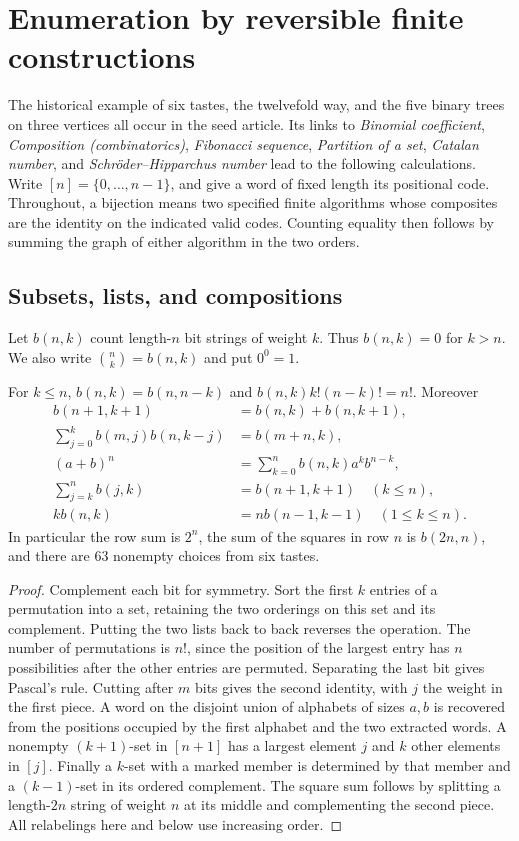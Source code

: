 \section{Enumeration by reversible finite constructions}
\label{sec:enumeration}
The historical example of six tastes, the twelvefold way, and the five
binary trees on three vertices all occur in the seed article. Its links to
\emph{Binomial coefficient}, \emph{Composition (combinatorics)},
\emph{Fibonacci sequence}, \emph{Partition of a set}, \emph{Catalan number},
and \emph{Schr\"oder--Hipparchus number} lead to the following calculations.
Write $[n]=\{0,\ldots,n-1\}$, and give a word of fixed length its positional
code. Throughout, a bijection means two specified finite algorithms whose
composites are the identity on the indicated valid codes. Counting equality
then follows by summing the graph of either algorithm in the two orders.

\subsection{Subsets, lists, and compositions}
Let $b(n,k)$ count length-$n$ bit strings of weight $k$. Thus $b(n,k)=0$
for $k>n$. We also write $\binom nk=b(n,k)$ and put $0^0=1$.
\begin{theorem}\label{result04}
For $k\le n$, $b(n,k)=b(n,n-k)$ and
$b(n,k)k!(n-k)!=n!$. Moreover
\begin{align*}
 b(n+1,k+1)&=b(n,k)+b(n,k+1),\\
 \sum_{j=0}^k b(m,j)b(n,k-j)&=b(m+n,k),\\
 (a+b)^n&=\sum_{k=0}^n b(n,k)a^k b^{n-k},\\
 \sum_{j=k}^n b(j,k)&=b(n+1,k+1) \quad(k\le n),\\
 k b(n,k)&=n b(n-1,k-1)\quad(1\le k\le n).
\end{align*}
In particular the row sum is $2^n$, the sum of the squares in row $n$ is
$b(2n,n)$, and there are $63$ nonempty choices from six tastes.
\end{theorem}
\begin{proof}
Complement each bit for symmetry. Sort the first $k$ entries of a
permutation into a set, retaining the two orderings on this set and its
complement. Putting the two lists back to back reverses the operation.
The number of permutations is $n!$, since the position of the largest
entry has $n$ possibilities after the other entries are permuted. Separating
the last bit gives Pascal's rule. Cutting after $m$ bits gives the second
identity, with $j$ the weight in the first piece. A word on the disjoint
union of alphabets of sizes $a,b$ is recovered from the positions occupied by
the first alphabet and the two extracted words. A nonempty $(k+1)$-set
in $[n+1]$ has a largest element $j$ and $k$ other elements in $[j]$.
Finally a $k$-set with a marked member is determined by that member and a
$(k-1)$-set in its ordered complement. The square sum follows by splitting
a length-$2n$ string of weight $n$ at its middle and complementing the
second piece. All relabelings here and below use increasing order.
\end{proof}

